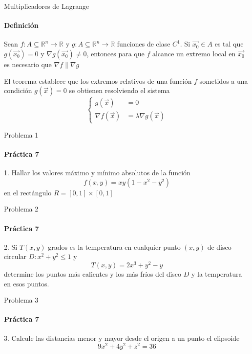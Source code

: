 \documentclass{plantillaPPT}
\begin{document}
\primeraDiapo

\begin{frame}{Multiplicadores de Lagrange}
\framesubtitle{Definición}

\begin{teorema}
    Sean $f:A\subseteq\mathbb{R}^n\to\mathbb{R}$ y $g:A\subseteq\mathbb{R}^n\to\mathbb{R}$ funciones de clase $C^1$. Si $\vec{x_0}\in A$ es tal que $g(\vec{x_0}) = 0$ y $\nabla g(\vec{x_0}) \neq 0$, entonces para que $f$ alcance un extremo local en $\vec{x_0}$ es necesario que $\nabla f \parallel \nabla g$
\end{teorema}
\vspace{0.5cm}
El teorema establece que los extremos relativos de una función $f$ sometidos a una condición $g(\vec{x}) =0$ se obtienen resolviendo el sistema
\vspace{-0.1cm}
\[
\left\{
\begin{aligned}
g(\vec{x}) &= 0 \\
\nabla f(\vec{x}) &= \lambda\nabla g(\vec{x})
\end{aligned}
\right.
\]

\end{frame}

\begin{frame}{Problema 1}
\framesubtitle{Práctica 7}
1. Hallar los valores máximo y mínimo absolutos de la función
\[
f(x,y) = xy(1-x^2-y^2)
\]
en el rectángulo $R = [0,1]\times[0,1]$
\end{frame}

\begin{frame}{Problema 2}
\framesubtitle{Práctica 7}
2. Si $T(x,y)$ grados es la temperatura en cualquier punto $(x,y)$ de disco circular $D: x^2+y^2\leq 1$ y
\[
T(x,y) = 2x^3+y^2-y
\]
determine los puntos más calientes y los más fríos del disco $D$ y la temperatura en esos puntos.
\end{frame}

\begin{frame}{Problema 3}
\framesubtitle{Práctica 7}

3. Calcule las distancias menor y mayor desde el origen a un punto el elipsoide
\[
9x^2+4y^2+z^2 = 36
\]

\end{frame}
\end{document}
